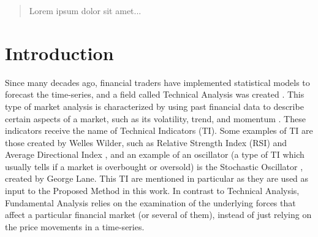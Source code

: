 \documentclass[12pt,journal,draftcls,onecolumn]{IEEEtran}
\begin{document}
\maketitle


\IEEEdisplaynotcompsoctitleabstractindextext


%
\IEEEpeerreviewmaketitle









\begin{abstract}
Lorem ipsum dolor sit amet...
\end{abstract}

\section{Introduction}

Since many decades ago, financial traders have implemented statistical
models to forecast the time-series, and a field called Technical
Analysis was created \cite{lo2000foundations}. This type of market
analysis is characterized by using past financial data to describe
certain aspects of a market, such as its volatility, trend, and
momentum \cite{achelis2001technical}. These indicators receive the
name of Technical Indicators (TI). Some examples of TI are those
created by Welles Wilder, such as Relative Strength Index (RSI) and
Average Directional Index \cite{wilder1978new}, and an example of an
oscillator (a type of TI which usually tells if a market is overbought
or oversold) is the Stochastic Oscillator
\cite{schirding1984stochastic}, created by George Lane. This TI are
mentioned in particular as they are used as input to the Proposed
Method in this work. In contrast to
Technical Analysis, Fundamental Analysis relies on the examination of
the underlying forces that affect a particular financial market (or
several of them), instead of just relying on the price movements in a
time-series.
\end{document}
